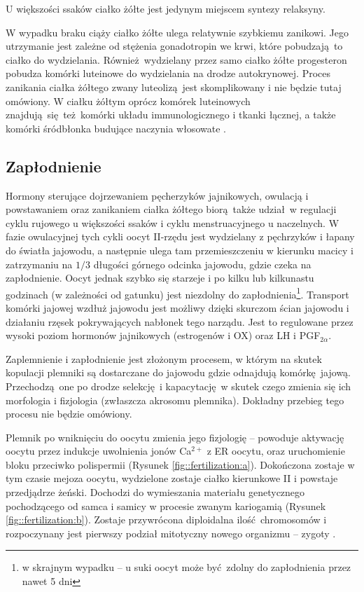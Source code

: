 \documentclass[two column, twoside, a4paper]{article}
\begin{document}
U większości ssaków ciałko żółte jest jedynym miejscem syntezy relaksyny.

W wypadku braku ciąży ciałko żółte ulega relatywnie szybkiemu zanikowi. Jego utrzymanie jest zależne od stężenia gonadotropin we krwi, które pobudzają to ciałko do wydzielania. Również wydzielany przez samo ciałko żółte progesteron pobudza komórki luteinowe do wydzielania na drodze autokrynowej. Proces zanikania ciałka żółtego zwany luteolizą jest skomplikowany i nie będzie tutaj omówiony.
W ciałku żółtym oprócz komórek luteinowych znajdują się też komórki układu immunologicznego i tkanki łącznej, a także komórki śródbłonka budujące naczynia włosowate \autocite{Krzymowski2005, Sawicki2017}.

\subsection{Zapłodnienie}

Hormony sterujące dojrzewaniem pęcherzyków jajnikowych, owulacją i powstawaniem oraz zanikaniem ciałka żółtego biorą także udział w regulacji cyklu rujowego u większości ssaków i cyklu menstruacyjnego u naczelnych. W fazie owulacyjnej tych cykli oocyt II-rzędu jest wydzielany z pęchrzyków i łapany do światła jajowodu, a następnie ulega tam przemieszczeniu w kierunku macicy i zatrzymaniu na $1/3$ długości górnego odcinka jajowodu, gdzie czeka na zapłodnienie. Oocyt jednak szybko się starzeje i po kilku lub kilkunastu godzinach (w zależności od gatunku) jest niezdolny do zapłodnienia\footnote{w skrajnym wypadku -- u suki oocyt może być zdolny do zapłodnienia przez nawet 5 dni}. Transport komórki jajowej wzdłuż jajowodu jest możliwy dzięki skurczom ścian jajowodu i działaniu rzęsek pokrywających nabłonek tego narządu. Jest to regulowane przez wysoki poziom hormonów jajnikowych (estrogenów i OX) oraz LH i PGF$_{2\alpha}$. \autocite{Krzymowski2005}

Zaplemnienie i zapłodnienie jest złożonym procesem, w którym na skutek kopulacji plemniki są dostarczane do jajowodu gdzie odnajdują komórkę jajową. Przechodzą one po drodze selekcję i kapacytację w skutek czego zmienia się ich morfologia i fizjologia (zwłaszcza akrosomu plemnika). Dokładny przebieg tego procesu nie będzie omówiony.

Plemnik po wniknięciu do oocytu zmienia jego fizjologię -- powoduje aktywację oocytu przez indukcje uwolnienia jonów Ca$^{2+}$ z ER oocytu, oraz uruchomienie bloku przeciwko polispermii (Rysunek \ref{fig::fertilization:a}). Dokończona zostaje w tym czasie mejoza oocytu, wydzielone zostaje ciałko kierunkowe II i powstaje przedjądrze żeński. Dochodzi do wymieszania materiału genetycznego pochodzącego od samca i samicy w procesie zwanym kariogamią (Rysunek \ref{fig::fertilization:b}). Zostaje przywrócona diploidalna ilość chromosomów i rozpoczynany jest pierwszy podział mitotyczny nowego organizmu -- zygoty \autocite{Krzymowski2005, Bielanska2001}.
\end{document}
